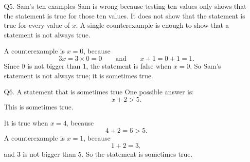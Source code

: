 \documentclass[14pt,a4paper]{extarticle}
\begin{document}
\begin{sol}{Q5. Sam's ten examples}
Sam is wrong because testing ten values only shows that the statement is
true for those ten values. It does not show that the statement is true for
every value of \(x\). A single counterexample is enough to show that a
statement is not always true.

A counterexample is \(x=0\), because
\[
3x=3\times 0=0
\qquad\text{and}\qquad
x+1=0+1=1.
\]
Since \(0\) is not bigger than \(1\), the statement is false when \(x=0\).
So Sam's statement is not always true; it is sometimes true.
\end{sol}

\begin{sol}{Q6. A statement that is sometimes true}
One possible answer is:
\[
x+2>5.
\]
This is sometimes true.

It is true when \(x=4\), because
\[
4+2=6>5.
\]
A counterexample is \(x=1\), because
\[
1+2=3,
\]
and \(3\) is not bigger than \(5\). So the statement is sometimes true.
\end{sol}
\end{document}

